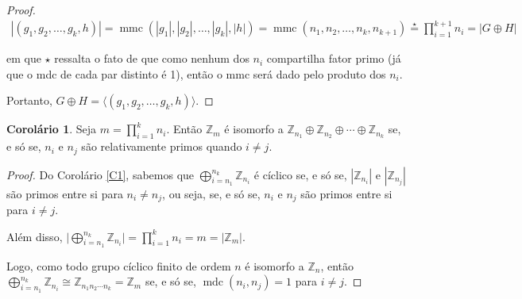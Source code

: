 \documentclass[a4paper,portuguese,11pt,twoside, leqno]{book}
\DeclareMathOperator{\mdc}{mdc}
\DeclareMathOperator{\mmc}{mmc}
\theoremstyle{definition}
\newtheorem{corollary}{Corolário}[theorem]
\newtheorem{remark}{Observação}[section]
\begin{document}
\begin{proof}
		\begin{align*}
		|(g_1, g_2, \dots, g_k, h)| = \mmc(|g_1|, |g_2|, \dots, |g_k|, |h|) = \mmc(n_1, n_2, \dots, n_k, n_{k+1}) \overset{\star}{=} \prod_{i=1}^{k+1}n_i = |G\oplus H|
		\end{align*} 
		\par\vspace{0.3cm} em que $\star$ ressalta o fato de que como nenhum dos $n_i$ compartilha fator primo (já que o mdc de cada par distinto é 1), então o mmc será dado pelo produto dos $n_i$.
		\par\vspace{0.3cm} Portanto, $G\oplus H = \langle (g_1, g_2, \dots, g_k, h) \rangle$. 
		
	\end{proof}
	
	\begin{corollary}
		\label{C2}
		Seja $\displaystyle{m = \prod_{i=1}^{k}n_i}$. Então $\mathbb{Z}_m$ é isomorfo a $\mathbb{Z}_{n_1}\oplus\mathbb{Z}_{n_2}\oplus\cdots\oplus\mathbb{Z}_{n_k}$ se, e só se, $n_i$ e $n_j$ são relativamente primos quando $i\neq j$.
	\end{corollary}
	
	\begin{proof}
		Do Corolário \eqref{C1}, sabemos que $\displaystyle{\bigoplus_{i=n_1}^{n_k} \mathbb{Z}_{n_i}}$ é cíclico se, e só se, $|\mathbb{Z}_{n_i}|$ e $|\mathbb{Z}_{n_j}|$ são primos entre si para $n_i\neq n_j$, ou seja, se, e só se, $n_i$ e $n_j$ são primos entre si para $i\neq j$. 
		\par\vspace{0.3cm} Além disso, $\Bigg|\displaystyle{\bigoplus_{i=n_1}^{n_k} \mathbb{Z}_{n_i}\Bigg| = \prod_{i = 1}^{k}n_i = m = |\mathbb{Z}_m|}$. 
		\par\vspace{0.3cm} Logo, como todo grupo cíclico finito de ordem $n$ é isomorfo a $\mathbb{Z}_n$, então $\displaystyle{\bigoplus_{i=n_1}^{n_k} \mathbb{Z}_{n_i} \cong \mathbb{Z}_{n_1n_2\cdots n_k}} = \mathbb{Z}_m$ se, e só se, $\mdc(n_i, n_j) = 1$ para $i\neq j$. 
		
	\end{proof}
	
	
\end{document}
